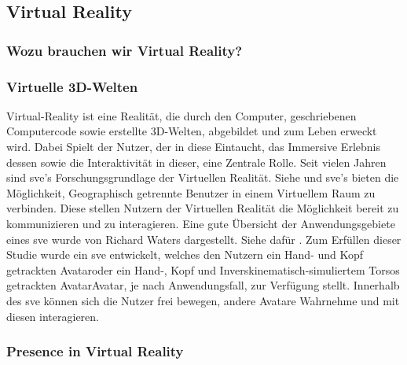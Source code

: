\documentclass[a4paper,11pt]{article}%
\renewcommand{\\}{\vspace*{0.5\baselineskip} \newline}
\begin{document}
		\subsection{Virtual Reality}
		\subsubsection{Wozu brauchen wir Virtual Reality?}
			\subsubsection{Virtuelle 3D-Welten}
Virtual-Reality ist eine Realität, die durch den Computer, geschriebenen Computercode sowie erstellte 3D-Welten, abgebildet und zum Leben erweckt wird. Dabei Spielt der Nutzer, der in diese Eintaucht, das Immersive Erlebnis dessen sowie die Interaktivität in dieser, eine Zentrale Rolle. \citep[p.6-12]{sherman2018understanding}
	Seit vielen Jahren sind \ac{sve}'s Forschungsgrundlage der Virtuellen Realität. Siehe \citep{shuffler2011there} \citep{steed1999leadership} und \citep{de2011level} \\
	\ac{sve}'s bieten die Möglichkeit, Geographisch getrennte Benutzer in einem Virtuellem Raum zu verbinden. Diese stellen Nutzern der Virtuellen Realität die Möglichkeit bereit zu kommunizieren und zu interagieren. \citep[p. 1-3]{pettifer1999designing} Eine gute Übersicht der Anwendungsgebiete eines \ac{sve} wurde von Richard Waters dargestellt. Siehe dafür \citep{waters1997rise}.
	Zum Erfüllen dieser Studie wurde ein \ac{sve} entwickelt, welches den Nutzern ein \grqq Hand- und Kopf getrackten Avatar\grqq oder ein \grqq Hand-, Kopf und Inverskinematisch-simuliertem Torsos getrackten Avatar\grqq Avatar, je nach Anwendungsfall, zur Verfügung stellt. Innerhalb des \ac{sve} können sich die Nutzer frei bewegen, andere Avatare Wahrnehme und mit diesen interagieren.
	
			\subsubsection{Presence in Virtual Reality}
			
\end{document}
